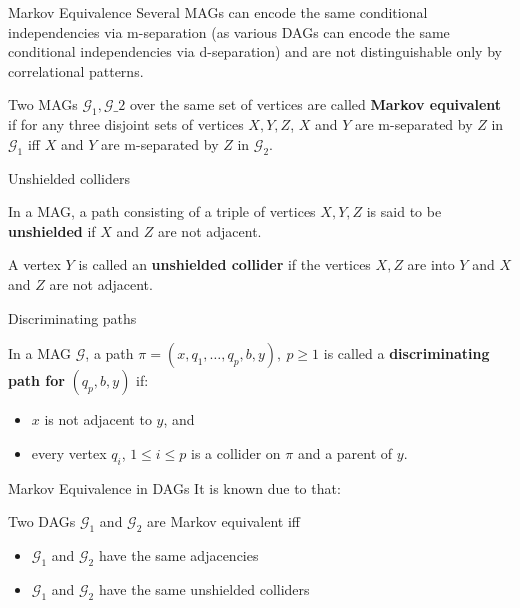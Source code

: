 \documentclass[english, compress, red]{beamer}
\begin{document}
\begin{frame}{Markov Equivalence}
		Several MAGs can encode the same conditional independencies via m-separation (as various DAGs can encode the same conditional independencies via d-separation) and are not distinguishable only by correlational patterns.
		
		\begin{definition}Two MAGs $\mathcal{G}_1,\mathcal{G}\_2$ over the same set of vertices are called \textbf{Markov equivalent} if for any three
			disjoint sets of vertices $X,Y,Z$, $X$ and $Y$ are m-separated by $Z$ in $\mathcal{G}_1$ iff $X$ and $Y$ are m-separated by $Z$ in $\mathcal{G}_2$.
		\end{definition}
\end{frame}

\begin{frame}{Unshielded colliders}
	\begin{definition}In a MAG, a path consisting of a triple of vertices $X,Y,Z$ is said to be \textbf{unshielded} if $X$ and $Z$ are not adjacent.
	\end{definition}

    \begin{definition}A vertex $Y$ is called an \textbf{unshielded collider} if the vertices $X, Z$ are into $Y$ and $X$ and $Z$ are not adjacent.
    \end{definition}
\end{frame}

\begin{frame}{Discriminating paths}
	\begin{definition}In a MAG $\mathcal{G}$, a path $\pi = (x, q_1,\ldots, q_p,b, y), ~p \geq 1$ is called a \textbf{discriminating path for} $(q_p, b, y)$ if:
		\begin{itemize}
			\item $x$ is not adjacent to $y$, and
			\item every vertex $q_i$, $1 \leq i \leq p$ is a collider on $\pi$ and a parent of $y$.
		\end{itemize}
	\end{definition}
\end{frame}

\begin{frame}{Markov Equivalence in DAGs}
	It is known due to \cite{verma1990equivalence} that:
	\begin{theorem} Two DAGs $\mathcal{G}_1$ and $\mathcal{G}_2$ are Markov equivalent iff
		\begin{itemize}
			\item $\mathcal{G}_1$ and $\mathcal{G}_2$ have the same adjacencies
			\item $\mathcal{G}_1$ and $\mathcal{G}_2$ have the same unshielded colliders
		\end{itemize}
	\end{theorem}
\end{frame}
 
\end{document}
